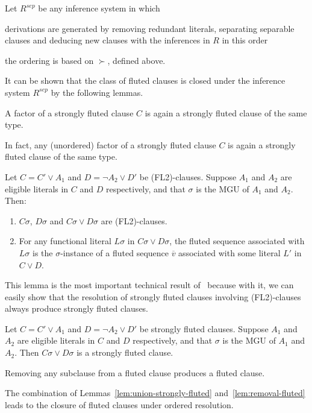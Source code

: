 \begin{definition}
  Let \(R^{sep}\) be any inference system in which
  \begin{enumerate*}[label = (\roman*)]
    \item derivations are generated by removing redundant literals, separating separable clauses and deducing new clauses with the inferences in \(R\) in this order
    \item the ordering is based on \(\succ\), defined above.
  \end{enumerate*}
\end{definition}
It can be shown that the class of fluted clauses is closed under the inference system \(R^{sep}\) by the following lemmas.

\begin{lemma}\label{lem:factor-strongly-fluted}
  A factor of a strongly fluted clause \(C\) is again a strongly fluted clause of the same type.
\end{lemma}
In fact, any (unordered) factor of a strongly fluted clause \(C\) is again a strongly fluted clause of the same type.

\begin{lemma}
  Let \(C = C' \lor A_1\) and \(D = \neg A_2 \lor D'\) be (FL2)-clauses.
  Suppose \(A_1\) and \(A_2\) are eligible literals in \(C\) and \(D\) respectively, and that \(\sigma\) is the MGU of \(A_1\) and \(A_2\).
  Then:
  \begin{enumerate}
    \item \(C\sigma\), \(D\sigma\) and \(C\sigma \lor D\sigma\) are (FL2)-clauses.
    \item For any functional literal \(L\sigma\) in \(C\sigma \lor D\sigma\), the fluted sequence associated with \(L\sigma\) is the \(\sigma\)-instance of a fluted sequence \(\overline{v}\) associated with some literal \(L'\) in \(C \lor D\).
  \end{enumerate}
\end{lemma}
This lemma is the most important technical result of~\cite{hustadt2000resolution} because with it, we can easily show that the resolution of strongly fluted clauses involving (FL2)-clauses always produce strongly fluted clauses.
\begin{lemma}\label{lem:union-strongly-fluted}
  Let \(C = C' \lor A_1\) and \(D = \neg A_2 \lor D'\) be strongly fluted clauses. Suppose \(A_1\) and \(A_2\) are eligible literals in \(C\) and \(D\) respectively, and that \(\sigma\) is the MGU of \(A_1\) and \(A_2\).
  Then \(C\sigma \lor D\sigma\) is a strongly fluted clause.
\end{lemma}
\begin{lemma}\label{lem:removal-fluted}
  Removing any subclause from a fluted clause produces a fluted clause.
\end{lemma}
The combination of Lemmas~\ref{lem:union-strongly-fluted} and~\ref{lem:removal-fluted} leads to the closure of fluted clauses under ordered resolution.

